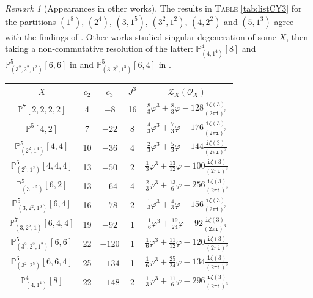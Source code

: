 \documentclass[12pt,a4paper,oneside]{amsart}
\numberwithin{equation}{section}
\theoremstyle{definition}
\theoremstyle{remark}
\newtheorem{rmk}[thm]{Remark}
\newcommand{\cP}{\mathbb{P}}
\newcommand{\mz}{\mathcal{Z}}
\newcommand{\ii}{\mathtt{i}}
\begin{document}
\begin{rmk}[Appearances in other works]
    The results in \textsc{Table} \ref{tab:listCY3} for the partitions $(1^8)$, $(2^4)$, $(3,1^5)$, $(3^2,1^2)$, $(4,2^2)$ and $(5,1^3)$ agree with the findings of \cite[Table 3]{Katz:2023zan}. Other works studied singular degeneration of some $X$, then taking a non-commutative resolution of the latter: $\cP^{4}_{(4,1^4)} [8]$ and $\cP^5_{(3^2,2^2,1^2)}[6,6]$ in \cite{Schimannek:2025cok} and $\cP^5_{(3,2^2,1^3)} [6,4]$ in \cite{Knapp:2025hnf}.
\end{rmk}

\begin{table}[th]
\centering
\begin{tabular}{|c |c |c |c | c|}
	\hline
	$X$ & $c_2$ & $c_3$ & $J^3$ & $\mz_X (\mathcal{O}_{X})$ \\
	\hline
	$\cP^{7} [2,2,2,2]$ & 4 & $-8$ & 16 & $\frac{8}{3} \varphi^3 + \frac{8}{3} \varphi -128 \frac{\ii \zeta (3)}{(2\pi\ii)^3}$ \\
	$\cP^{5} [4,2]$ & 7 & $-22$ & 8 & $\frac{4}{3} \varphi^3 + \frac{7}{3} \varphi - 176\frac{\ii \zeta (3)}{(2\pi\ii)^3}$ \\
	$\cP^{5}_{(2^2,1^4)} [4,4]$ &  10 & $-36$ & 4 & $\frac{2}{3} \varphi^3 + \frac{5}{3} \varphi - 144\frac{\ii \zeta (3)}{(2\pi\ii)^3}$  \\
	$\cP^{6}_{(2^5,1^2)} [4,4,4]$ & 13 & $-50$ & 2 & $\frac{1}{3} \varphi^3 + \frac{13}{12} \varphi - 100\frac{\ii \zeta (3)}{(2\pi\ii)^3}$ \\
	$\cP^{5}_{(3,1^5)} [6,2]$ &  13 & $-64$ & 4 & $\frac{2}{3} \varphi^3 + \frac{13}{6} \varphi - 256\frac{\ii \zeta (3)}{(2\pi\ii)^3}$  \\
	$\cP^{5}_{(3,2^2,1^3)} [6,4]$ & 16 & $-78$ & 2 & $\frac{1}{3} \varphi^3 + \frac{4}{3} \varphi - 156\frac{\ii \zeta (3)}{(2\pi\ii)^3}$  \\
	$\cP^{7}_{(3,2^5,1)} [6,4,4]$ & 19 & $-92$ & 1 & $\frac{1}{6} \varphi^3 + \frac{19}{24} \varphi - 92\frac{\ii \zeta (3)}{(2\pi\ii)^3}$  \\
	$\cP_{(3^2,2^2,1^2)}^{5} [6,6]$ & 22 & $-120$ & 1 & $\frac{1}{6} \varphi^3 + \frac{11}{12} \varphi - 120\frac{\ii \zeta (3)}{(2\pi\ii)^3}$  \\
	$\cP^{6}_{(3^2,2^5)} [6,6,4]$ & 25 & $-134$ & 1 & $\frac{1}{6} \varphi^3 + \frac{25}{24} \varphi - 134\frac{\ii \zeta (3)}{(2\pi\ii)^3}$ \\
	$\cP^{4}_{(4,1^4)} [8]$ & 22 & $-148$ & 2 & $\frac{1}{3} \varphi^3 + \frac{11}{6} \varphi - 296\frac{\ii \zeta (3)}{(2\pi\ii)^3}$  \\

\end{tabular}
\end{table}
\end{document}
